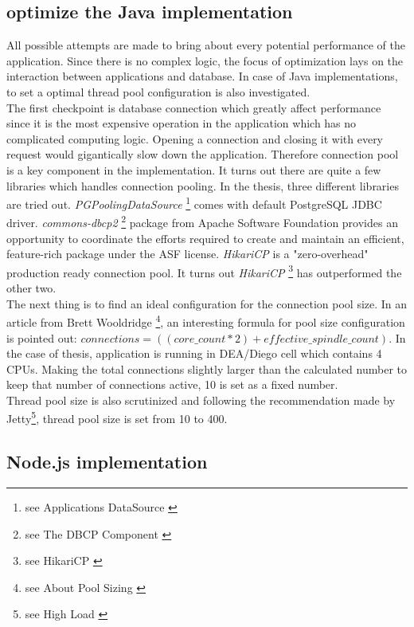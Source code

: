 \subsection{optimize the Java implementation}
All possible attempts are made to bring about every potential performance of the application. Since there is no complex logic, the focus of optimization lays on the interaction between applications and database. In case of Java implementations, to set a optimal thread pool configuration is also investigated. \\
The first checkpoint is database connection which greatly affect performance since it is the most expensive operation in the application which has no complicated computing logic. Opening a connection and closing it with every request would gigantically slow down the application. Therefore connection pool is a key component in the implementation. It turns out there are quite a few libraries which handles connection pooling. In the thesis,  three different libraries are tried out. \textit{PGPoolingDataSource}  \footnote{see Applications DataSource \citep{pgpool} }  comes with default PostgreSQL JDBC driver. \textit{commons-dbcp2} \footnote{see The DBCP Component \citep{dbcp} } package from Apache Software Foundation provides an opportunity to coordinate the efforts required to create and maintain an efficient, feature-rich package under the \ac{ASF} license. \textit{HikariCP} is a "zero-overhead" production ready connection pool. It turns out \textit{HikariCP} \footnote{see HikariCP \citep{hikari}}  has outperformed the other two. \\
The next thing is to find an ideal configuration for the connection pool size. In an article from Brett Wooldridge \footnote{see About Pool Sizing \citep{hikari}}, an interesting formula for pool size configuration is pointed out: $connections = ((core\_count * 2) + effective\_spindle\_count)$. In the case of thesis, application is running in DEA/Diego cell which contains 4 CPUs. Making the total connections slightly larger than the calculated number to keep that number of connections active, 10 is set as a fixed number. \\ 
Thread pool size is also scrutinized and following the recommendation made by Jetty\footnote{see High Load \citep{threadpool}}, thread pool size is set from 10 to 400. \\

 \subsection{Node.js implementation}
 
